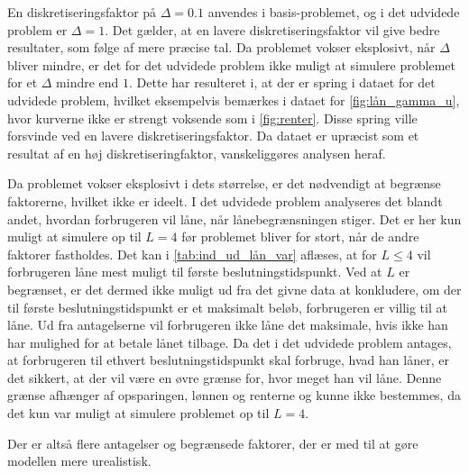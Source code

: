 En diskretiseringsfaktor på $\Delta = 0.1$ anvendes i basis-problemet, og i det udvidede problem er $\Delta = 1$. Det gælder, at en lavere diskretiseringsfaktor vil give bedre resultater, som følge af mere præcise tal. Da problemet vokser eksplosivt, når $\Delta$ bliver mindre, er det for det udvidede problem ikke muligt at simulere problemet for et $\Delta$ mindre end $1$. Dette har resulteret i, at der er spring i dataet for det udvidede problem, hvilket eksempelvis bemærkes i dataet for \autoref{fig:lån_gamma_u}, hvor kurverne ikke er strengt voksende som i \autoref{fig:renter}. Disse spring ville forsvinde ved en lavere diskretiseringsfaktor. Da dataet er upræcist som et resultat af en høj diskretiseringfaktor, vanskeliggøres analysen heraf. %

Da problemet vokser eksplosivt i dets størrelse, er det nødvendigt at begrænse faktorerne, hvilket ikke er ideelt. I det udvidede problem analyseres det blandt andet, hvordan forbrugeren vil låne, når lånebegrænsningen stiger. Det er her kun muligt at simulere op til $L=4$ før problemet bliver for stort,
når de andre faktorer fastholdes. Det kan i \autoref{tab:ind_ud_lån_var} aflæses, at for $L \leq 4$ vil forbrugeren låne mest muligt til første beslutningstidspunkt. Ved at $L$ er begrænset, er det dermed ikke muligt ud fra det givne data at konkludere, om der til første beslutningstidspunkt er et maksimalt beløb, forbrugeren er villig til at låne. Ud fra antagelserne vil forbrugeren ikke låne det maksimale, hvis ikke han har mulighed for at betale lånet tilbage. Da det i det udvidede problem antages, at forbrugeren til ethvert beslutningstidspunkt skal forbruge, hvad han låner, er det sikkert, at der vil være en øvre grænse for, hvor meget han vil låne. Denne grænse afhænger af opsparingen, lønnen og renterne og kunne ikke bestemmes, da det kun var muligt at simulere problemet op til $L = 4$.

Der er altså flere antagelser og begrænsede faktorer, der er med til at gøre modellen mere urealistisk.

